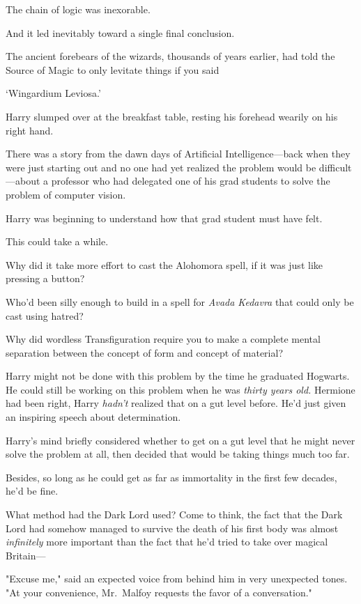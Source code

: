 The chain of logic was inexorable.

And it led inevitably toward a single final conclusion.

The ancient forebears of the wizards, thousands of years earlier, had told the
Source of Magic to only levitate things if you said{\el}

`Wingardium Leviosa.'

Harry slumped over at the breakfast table, resting his forehead wearily on his
right hand.

There was a story from the dawn days of Artificial Intelligence---back when
they were just starting out and no one had yet realized the problem would be
difficult---about a professor who had delegated one of his grad students to
solve the problem of computer vision.

Harry was beginning to understand how that grad student must have felt.

This could take a while.

Why did it take more effort to cast the Alohomora spell, if it was just like
pressing a button?

Who'd been silly enough to build in a spell for \emph{Avada Kedavra} that could
only be cast using hatred?

Why did wordless Transfiguration require you to make a complete mental
separation between the concept of form and concept of material?

Harry might not be done with this problem by the time he graduated Hogwarts. He
could still be working on this problem when he was \emph{thirty years old.}
Hermione had been right, Harry \emph{hadn't} realized that on a gut level
before. He'd just given an inspiring speech about determination.

Harry's mind briefly considered whether to get on a gut level that he might
never solve the problem at all, then decided that would be taking things much
too far.

Besides, so long as he could get as far as immortality in the first few
decades, he'd be fine.

What method had the Dark Lord used? Come to think, the fact that the Dark Lord
had somehow managed to survive the death of his first body was almost
\emph{infinitely} more important than the fact that he'd tried to take over
magical Britain---

"Excuse me," said an expected voice from behind him in very unexpected tones.
"At your convenience, Mr.~Malfoy requests the favor of a conversation."

